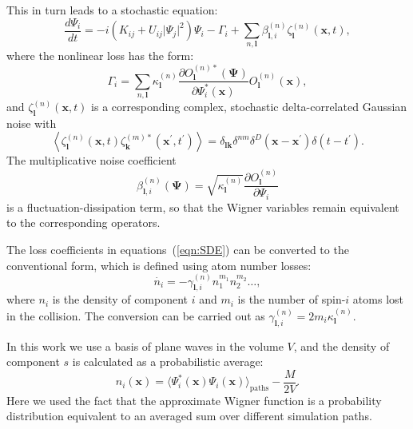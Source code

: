 \documentclass[aps,prl,twocolumn,showpacs,amsmath,amssymb,superscriptaddress,flushbottom,noraggedfooter]{revtex4-1}
\newcommand{\xvec}{\boldsymbol{x}}
\newcommand{\kvec}{\boldsymbol{k}}
\newcommand{\lvec}{\boldsymbol{l}}
\newcommand{\Psivec}{\boldsymbol{\Psi}}
\begin{document}
This in turn leads to a stochastic equation:
\begin{equation}
\label{eqn:SDE}
	\frac{d\Psi_{i}}{dt} =
		- i\left( K_{ij} + U_{ij} \lvert \Psi_{j} \rvert^{2} \right) \Psi_{i}
		- \Gamma_{i}
		+ \sum_{n,\lvec} \beta_{\lvec,i}^{(n)} \zeta_{\lvec}^{(n)}(\xvec,t),
\end{equation}
where the nonlinear loss has the form:
\begin{equation}
	\Gamma_{i} = \sum_{n,\lvec}
		\kappa_{\lvec}^{(n)}
		\frac{\partial O_{\lvec}^{(n)*} (\Psivec)}{\partial\Psi_{i}^{*} (\xvec)}
		O_{\lvec}^{(n)}(\xvec),
\end{equation}
and $\zeta_{\lvec}^{(n)}(\xvec, t)$ is a corresponding complex,
stochastic delta-correlated Gaussian noise with
\begin{equation}
	\left\langle
		\zeta_{\lvec}^{(n)} (\xvec,t) \zeta_{\kvec}^{(m)*}(\xvec^\prime, t^\prime)
	\right\rangle =
	\delta_{\lvec \kvec} \delta^{nm} \delta^{D} \left(
		\xvec - \xvec^\prime
	\right)
	\delta \left( t - t^\prime \right).
\end{equation}
The multiplicative noise coefficient
\begin{equation}
	\beta_{\lvec,i}^{(n)} \left( \Psivec \right) =
	\sqrt{\kappa_{\lvec}^{(n)}}
	\frac{\partial O_{\lvec}^{(n)}}{\partial\Psi_{i}}
\end{equation}
is a fluctuation-dissipation term,
so that the Wigner variables remain equivalent to the corresponding operators.

The loss coefficients in equations~(\ref{eqn:SDE}) can be converted to the conventional form,
which is defined using atom number losses:
\begin{equation}
	\dot{n_i} = - \gamma^{(n)}_{\lvec,i} n^{m_1}_1 n^{m_2}_2 \ldots ,
\end{equation}
where $n_i$ is the density of component $i$ and $m_i$
is the number of spin-$i$ atoms lost in the collision.
The conversion can be carried out as $\gamma^{(n)}_{\lvec,i} = 2 m_i \kappa^{(n)}_{\lvec}$.

In this work we use a basis of plane waves in the volume $V$,
and the density of component $s$ is calculated as a probabilistic average:
\begin{equation}
\label{eqn:wigner-density}
	n_i (\xvec)
		= \langle \Psi^*_i (\xvec) \Psi_i (\xvec) \rangle_{\mathrm{paths}} - \frac{M}{2V}.
\end{equation}
Here we used the fact that the approximate Wigner function is a probability distribution
equivalent to an averaged sum over different simulation paths.
\end{document}
